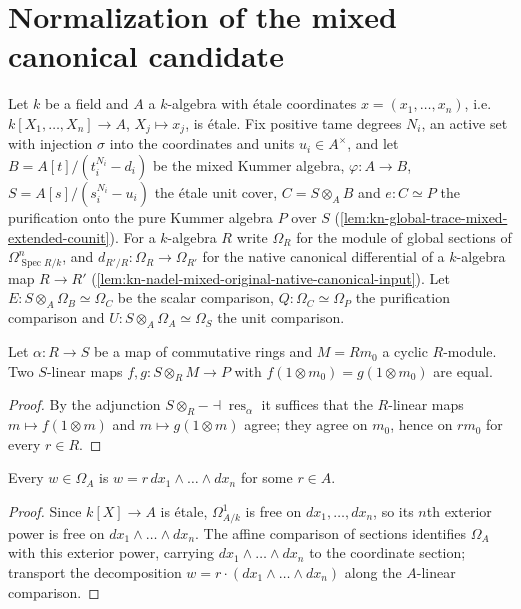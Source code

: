 \section{Normalization of the mixed canonical candidate}
\label{sec:kn-nadel-mixed-candidate-normalization}

Let $k$ be a field and $A$ a $k$-algebra with \'etale coordinates
$x=(x_1,\dots,x_n)$, i.e.\ $k[X_1,\dots,X_n]\to A$, $X_j\mapsto x_j$, is
\'etale. Fix positive tame degrees $N_i$, an active set with injection
$\sigma$ into the coordinates and units $u_i\in A^\times$, and let
$B=A[t]/(t_i^{N_i}-d_i)$ be the mixed Kummer algebra, $\varphi:A\to B$,
$S=A[s]/(s_i^{N_i}-u_i)$ the \'etale unit cover, $C=S\otimes_AB$ and
$e:C\simeq P$ the purification onto the pure Kummer algebra $P$ over $S$
(\cref{lem:kn-global-trace-mixed-extended-counit}). For a $k$-algebra $R$ write
$\Omega_R$ for the module of global sections of $\Omega^n_{\operatorname{Spec}R/k}$,
and $d_{R'/R}:\Omega_R\to\Omega_{R'}$ for the native canonical differential of
a $k$-algebra map $R\to R'$ (\cref{lem:kn-nadel-mixed-original-native-canonical-input}).
Let $E:S\otimes_A\Omega_B\simeq\Omega_C$ be the scalar comparison,
$Q:\Omega_C\simeq\Omega_P$ the purification comparison and
$U:S\otimes_A\Omega_A\simeq\Omega_S$ the unit comparison.

\begin{lemma}
\label{lem:kn-nadel-extend-scalars-hom-ext-generator}
\leanok
Let $\alpha:R\to S$ be a map of commutative rings and $M=Rm_0$ a cyclic
$R$-module. Two $S$-linear maps $f,g:S\otimes_RM\to P$ with
$f(1\otimes m_0)=g(1\otimes m_0)$ are equal.
\end{lemma}
\begin{proof}
By the adjunction $S\otimes_R-\dashv\operatorname{res}_\alpha$ it suffices that the
$R$-linear maps $m\mapsto f(1\otimes m)$ and $m\mapsto g(1\otimes m)$ agree; they
agree on $m_0$, hence on $rm_0$ for every $r\in R$.
\end{proof}

\begin{lemma}
\label{lem:kn-nadel-base-canonical-sections-generated}
\leanok
Every $w\in\Omega_A$ is $w=r\,dx_1\wedge\dots\wedge dx_n$ for some $r\in A$.
\end{lemma}
\begin{proof}
Since $k[X]\to A$ is \'etale, $\Omega^1_{A/k}$ is free on $dx_1,\dots,dx_n$, so its
$n$th exterior power is free on $dx_1\wedge\dots\wedge dx_n$. The affine comparison
of sections identifies $\Omega_A$ with this exterior power, carrying
$dx_1\wedge\dots\wedge dx_n$ to the coordinate section; transport the
decomposition $w=r\cdot(dx_1\wedge\dots\wedge dx_n)$ along the $A$-linear comparison.
\end{proof}

